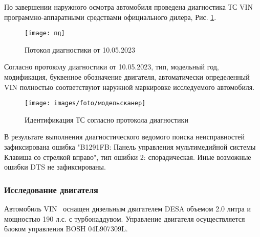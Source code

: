     По завершении наружного осмотра автомобиля проведена диагностика ТС VIN \vin\, программно-аппаратными средствами   официального дилера, Рис. \ref{пд}.
       \begin{figure}[H]
    	\centering
    	\texttt{[image: пд]}
    	\caption{Потокол диагностики от 10.05.2023}
    	\label{пд}
    \end{figure}
    
      Согласно протоколу диагностики от 10.05.2023, тип, модельный год, модификация, буквенное обозначение двигателя, автоматически определенный VIN полностью соответствуют наружной маркировке исследуемого автомобиля.
   
   \begin{figure}[H]
   	\centering
   	\texttt{[image: images/foto/модельсканер]}
   	\caption{Идентификация ТС согласно протокола диагностики}
   	\label{модельсканер}
   \end{figure}
   
   В результате выполнения диагностического ведомого поиска неисправностей  зафиксирована ошибка "B1291FB:  Панель управления мультимедийной системы Клавиша со стрелкой вправо", тип ошибки 2: спорадическая. Иные  возможные  ошибки DTS не зафиксированы. \\
   
\subsubsection{Исследование двигателя}
     
 Автомобиль  VIN \vin \, оснащен  дизельным двигателем DESA объемом 2.0 литра и мощностью 190 л.с. с турбонаддувом. Управление двигателя осуществляется блоком управления BOSH 04L907309L. 
  
